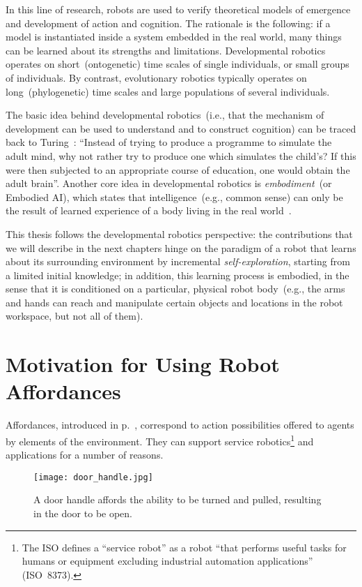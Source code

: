 In this line of research, robots are used to verify theoretical models of emergence and development of action and cognition.
The rationale is the following: if a model is instantiated inside a system embedded in the real world, many things can be learned about its strengths and limitations.
Developmental robotics operates on short~(ontogenetic) time scales of single individuals, or small groups of individuals.
By contrast, evolutionary robotics typically operates on long~(phylogenetic) time scales and large populations of several individuals.

The basic idea behind developmental robotics~(i.e., that the mechanism of development can be used to understand and to construct cognition) can be traced back to Turing~\cite{turing:1950}:
``Instead of trying to produce a programme to simulate the adult mind, why not rather try to produce one which simulates the child's? If this were then subjected to an appropriate course of education, one would obtain the adult brain''.
Another core idea in developmental robotics is \emph{embodiment}~(or Embodied \acl{AI}), which states that intelligence~(e.g., common sense) can only be the result of learned experience of a body living in the real world~\cite{pfeifer:2006}.

This thesis follows the developmental robotics perspective: the contributions that we will describe in the next chapters hinge on the paradigm of a robot that learns about its surrounding environment by incremental \emph{self-exploration}, starting from a limited initial knowledge; in addition, this learning process is embodied, in the sense that it is conditioned on a particular, physical robot body~(e.g., the arms and hands can reach and manipulate certain objects and locations in the robot workspace, but not all of them).

\section{Motivation for Using Robot Affordances}
\label{sec:motivation:affordances}

Affordances, introduced in p.~\pageref{aff_definition}, correspond to action possibilities offered to agents by elements of the environment.
They can support service robotics\footnote{The \ac{ISO} defines a ``service robot'' as a robot ``that performs useful tasks for humans or equipment excluding industrial automation applications'' (ISO~8373).} and \hri{} applications for a number of reasons.

\begin{figure}
\centering
\texttt{[image: door\_handle.jpg]}
\caption{A door handle affords the ability to be turned and pulled, resulting in the door to be open.}
\label{fig:door_handle}
\end{figure}

